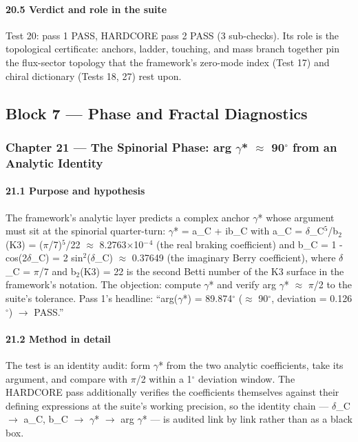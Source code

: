 \documentclass[10pt]{article}
\begin{document}
\paragraph{20.5 Verdict and role in the suite}

Test 20: pass 1 PASS, HARDCORE pass 2 PASS (3 sub-checks). Its role is the topological certificate: anchors, ladder, touching, and mass branch together pin the flux-sector topology that the framework's zero-mode index (Test 17) and chiral dictionary (Tests 18, 27) rest upon.

\subsection{Block 7 --- Phase and Fractal Diagnostics}

\subsubsection{Chapter 21 --- The Spinorial Phase: arg $\gamma$* $\approx$ 90$^\circ$ from an Analytic Identity}

\paragraph{21.1 Purpose and hypothesis}

The framework's analytic layer predicts a complex anchor $\gamma$* whose argument must sit at the spinorial quarter-turn: $\gamma$* = a\_C + i\textperiodcentered{}b\_C with a\_C = $\delta$\_C$^5$/b$_2$(K3) = ($\pi$/7)$^5$/22 $\approx$ 8.2763$\times$10$^-$$^4$ (the real braking coefficient) and b\_C = 1 - cos(2$\delta$\_C) = 2 sin$^2$($\delta$\_C) $\approx$ 0.37649 (the imaginary Berry coefficient), where $\delta$\_C = $\pi$/7 and b$_2$(K3) = 22 is the second Betti number of the K3 surface in the framework's notation. The objection: compute $\gamma$* and verify arg $\gamma$* $\approx$ $\pi$/2 to the suite's tolerance. Pass 1's headline: ``arg($\gamma$*) = 89.874$^\circ$ ($\approx$ 90$^\circ$, deviation = 0.126$^\circ$) $\rightarrow$ PASS.''

\paragraph{21.2 Method in detail}

The test is an identity audit: form $\gamma$* from the two analytic coefficients, take its argument, and compare with $\pi$/2 within a 1$^\circ$ deviation window. The HARDCORE pass additionally verifies the coefficients themselves against their defining expressions at the suite's working precision, so the identity chain --- $\delta$\_C $\rightarrow$ a\_C, b\_C $\rightarrow$ $\gamma$* $\rightarrow$ arg $\gamma$* --- is audited link by link rather than as a black box.
\end{document}
